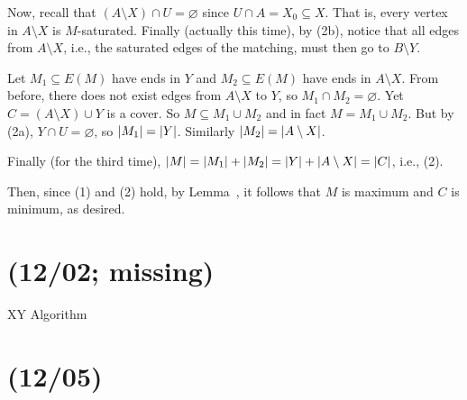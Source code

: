 \documentclass[class=math239,notes,tikz]{agony}
\begin{document}
\begin{prf}
  Now, recall that $(A \setminus X) \cap U = \varnothing$
  since $U \cap A = X_0 \subseteq X$.
  That is, every vertex in $A \setminus X$ is $M$-saturated.
  Finally (actually this time), by (2b),
  notice that all edges from $A \setminus X$, i.e.,
  the saturated edges of the matching, must then go to $B \setminus Y$.

  Let $M_1 \subseteq E(M)$ have ends in $Y$ and $M_2 \subseteq E(M)$ have ends in $A \setminus X$.
  From before, there does not exist edges from $A \setminus X$ to $Y$,
  so $M_1 \cap M_2 = \varnothing$.
  Yet $C = (A \setminus X) \cup Y$ is a cover.
  So $M \subseteq M_1 \cup M_2$ and in fact $M = M_1 \cup M_2$.
  But by (2a), $Y \cap U = \varnothing$, so $\abs{M_1} = \abs{Y}$.
  Similarly $\abs{M_2} = \abs{A \setminus X}$.
  
  Finally (for the third time), $\abs{M} = \abs{M_1} + \abs{M_2}
    = \abs{Y} + \abs{A \setminus X} = \abs{C}$, i.e., (2).

  Then, since (1) and (2) hold, by Lemma~,
  it follows that $M$ is maximum and $C$ is minimum, as desired.
\end{prf}

\section{(12/02; missing)}

XY Algorithm

\section{(12/05)}
\end{document}
